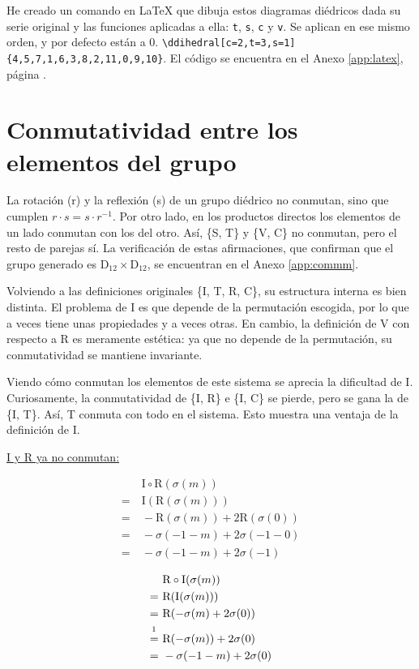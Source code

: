 	\pagebreak
	He creado un comando en \LaTeX{} que dibuja estos diagramas diédricos dada su serie original y las funciones aplicadas a ella: \verb|t|, \verb|s|, \verb|c| y \verb|v|. Se aplican en ese mismo orden, y por defecto están a 0. \linebreak \verb|\ddihedral[c=2,t=3,s=1]{4,5,7,1,6,3,8,2,11,0,9,10}|. El código se encuentra en el Anexo \ref{app:latex}, página \pageref{app:latex3}.
	
	\section{Conmutatividad entre los elementos del grupo}
	\label{conmut}
		
		La rotación (r) y la reflexión (s) de un grupo diédrico no conmutan, sino que cumplen $r\cdot s=s\cdot r^{-1}$. Por otro lado, en los productos directos los elementos de un lado conmutan con los del otro. Así, \{S, T\} y \{V, C\} no conmutan, pero el resto de parejas sí. La verificación de estas afirmaciones, que confirman que el grupo generado es D$_{12}\times\text{D}_{12}$, se encuentran en el Anexo \ref{app:commm}.
		
		Volviendo a las definiciones originales \{I, T, R, C\}, su estructura interna es bien distinta. El problema de I es que depende de la permutación escogida, por lo que a veces tiene unas propiedades y a veces otras. En cambio, la definición de V con respecto a R es meramente estética: ya que no depende de la permutación, su conmutatividad se mantiene invariante. 
		
		Viendo cómo conmutan los elementos de este sistema se aprecia la dificultad de I. Curiosamente, la conmutatividad de \{I, R\} e \{I, C\} se pierde, pero se gana la de \{I, T\}. Así, T conmuta con todo en el sistema. Esto muestra una ventaja de la definición de I.
		
		\newpage
		 \underline{I y R ya no conmutan:}
		 \vspace{-2\bigskipamount}
		\begin{multicols}{2}
			\begin{align*}
		&\ \text{I}\circ\text{R}(\sigma(m))\\
		=&\ \text{I}(\text{R}(\sigma(m)))\\
		=&\ -\text{R}(\sigma(m))+2\text{R}(\sigma(0))\\
		=&\ -\sigma(-1-m)+2\sigma(-1-0)\\
		=&\ -\sigma(-1-m)+2\sigma(-1)
		\end{align*}
		
		\begin{align*}
		&\ \text{R}\circ\text{I}(\sigma(m))\\
		=&\ \text{R}(\text{I}(\sigma(m)))\\
		=&\ \text{R}(-\sigma(m)+2\sigma(0))\\
		\overset{\footnotemark}{=}&\ \text{R}(-\sigma(m))+2\sigma(0)\\
		=&\ -\sigma(-1-m)+2\sigma(0)
		\end{align*}
		\end{multicols}
		
